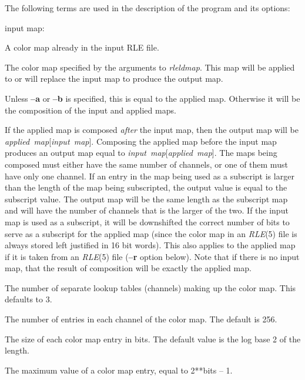 The following terms are used in the description of the program and its options:
\begin{TPlist}{input map:}
\item[{input map:}]
A color map already in the input RLE file.
\item[{applied map:}]
The color map specified by the arguments to
{\it rleldmap}{\rm .}
This map will be applied to or will replace the input map to produce
the output map.
\item[{output map:}]
Unless
{\bf --a}
or
{\bf --b}
is specified, this is equal to the applied map.  Otherwise it will be
the composition of the input and applied maps.
\item[{map composition:}]
If the applied map is composed 
{\it after}
the input map, then the output map will be 
{\it applied\ map}{\rm [}{\it input\ map}{\rm ].}
Composing the applied map before the input map produces an output map
equal to
{\it input\ map}{\rm [}{\it applied\ map}{\rm ].}
The maps being composed must either have the same number of channels,
or one of them must have only one channel.  If an entry in the map
being used as a subscript is larger than the length of the map being
subscripted, the output value is equal to the subscript value.
The output map will be the same
length as the subscript map and will have the number of channels that
is the larger of the two.  If the input map is used as a subscript, it
will be downshifted the correct number of bits to serve as a subscript
for the applied map (since the color map in an
{\it RLE}{\rm (5)}
file is always stored left justified in 16 bit words).  This also
applies to the applied map if it is taken from an
{\it RLE}{\rm (5)}
file 
{\rm (}{\bf --r}
option below).  Note that if there is no input map, that the result of
composition will be exactly the applied map.
\item[{nchan:}]
The number of separate lookup tables (channels) making up the color
map.  This defaults to 3.
\item[{length:}]
The number of entries in each channel of the color map.  The default
is 256.
\item[{bits:}]
The size of each color map entry in bits.  The default value is the
log base 2 of the length.
\item[{range:}]
The maximum value of a color map entry, equal to 2**bits -- 1.
\end{TPlist}
